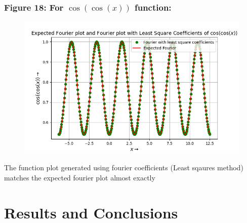 \documentclass[12pt, a4paper]{article}
\begin{document}
\subsubsection{Figure 18: For $\cos(\cos(x))$ function:}
\vspace*{-0.5cm}
\begin{figure}[H]
    \centering
    \includegraphics[scale = 0.7]{Figure_18.png}
    \label{fig:sample}
\end{figure}
\vspace*{-0.5cm}
\begin{center}
    The function plot generated using fourier coefficients (Least sqaures method) matches the expected fourier plot almost exactly  
\end{center}

\section{Results and Conclusions}
\end{document}
